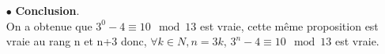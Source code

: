 \begin{enumerate}[1. ]
\begin{framed}
\begin{enumerate}
\item[$\bullet$]  {\bf Conclusion}. \\
On a obtenue que $3^0-4\equiv 10\mod{13}$ est vraie, cette même proposition est vraie au rang n et n+3 donc, $\forall k \in N, n=3k$, $3^n-4\equiv 10\mod{13}$ est vraie.
\end{enumerate}    

\end{framed}

\end{enumerate}


